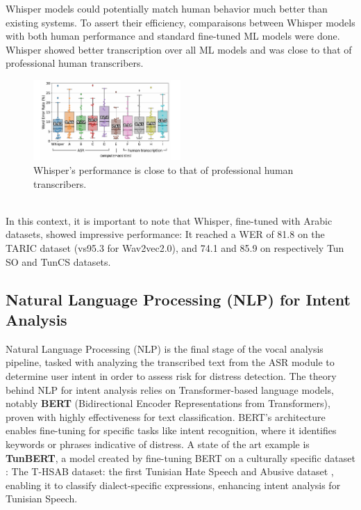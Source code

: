 \documentclass[12pt,a4paper,oneside,english]{book}
\begin{document}
{%
Whisper models could potentially match human behavior much better than existing systems.
To assert their efficiency, comparaisons between  Whisper models with both human performance
 and standard fine-tuned ML models were done. Whisper showed better transcription over all ML models and was close to that of professional human transcribers.
\begin{figure}[h!] %
    \centering
    \includegraphics[width=0.5\textwidth]{images/whisper_vs_others.png}
    \caption{Whisper's performance is close to that of professional human transcribers.}
    \label{fig:whisper_vs_others}
\end{figure}
\\In this context, it is important to note that Whisper, fine-tuned with Arabic datasets, showed impressive performance: 
It reached a WER of  81.8 on the TARIC dataset (vs95.3 for Wav2vec2.0), and 74.1 and 85.9 on respectively Tun SO and TunCS datasets.\cite{abdallah2023leveragingdatacollectionunsupervised}

\subsection{Natural Language Processing (NLP) for Intent Analysis}%
\label{sec:nlp_intent}
Natural Language Processing (NLP) is the final stage of the vocal analysis pipeline, tasked with analyzing the transcribed text from 
the ASR module to determine user intent in order to assess risk for distress detection.
The theory behind NLP for intent analysis relies on Transformer-based language models, notably \textbf{BERT} (Bidirectional Encoder 
Representations from Transformers), proven with highly effectiveness for text classification\cite{devlin-etal-2019-bert}.
BERT's architecture enables fine-tuning for specific tasks like intent recognition, where it identifies keywords or phrases 
indicative of distress.
A state of the art example is \textbf{TunBERT}, a model created by fine-tuning BERT on a culturally specific dataset : The T-HSAB dataset: the first Tunisian Hate Speech and Abusive dataset \cite{10.1007/978-3-030-32959-4_18THSAB}, enabling it to classify dialect-specific expressions, enhancing intent analysis for Tunisian Speech.

}
\end{document}
